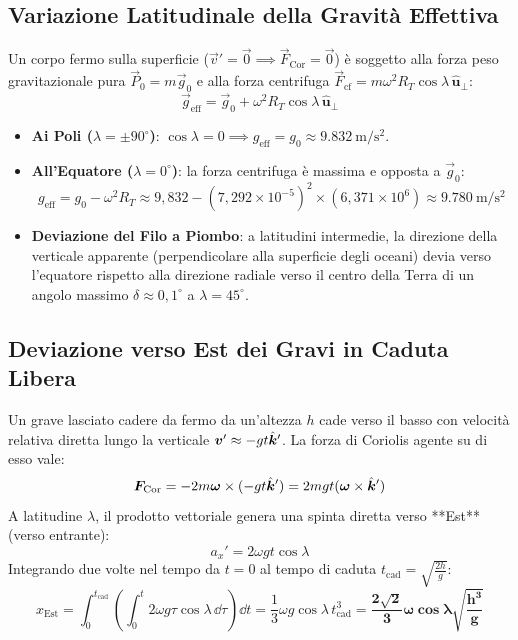 \subsection{Variazione Latitudinale della Gravità Effettiva}
Un corpo fermo sulla superficie ($\vec{v}' = \vec{0} \implies \vec{F}_{\text{Cor}} = \vec{0}$) è soggetto alla forza peso gravitazionale pura $\vec{P}_0 = m\vec{g}_0$ e alla forza centrifuga $\vec{F}_{\text{cf}} = m\omega^2 R_T \cos\lambda\,\hat{\bm{u}}_\perp$:
\begin{equation}
    \vec{g}_{\text{eff}} = \vec{g}_0 + \omega^2 R_T\cos\lambda\,\hat{\bm{u}}_\perp
\end{equation}
\begin{itemize}
    \item \textbf{Ai Poli ($\lambda = \pm 90^\circ$)}: $\cos\lambda = 0 \implies g_{\text{eff}} = g_0 \approx \SI{9.832}{\metre\per\second\squared}$.
    \item \textbf{All'Equatore ($\lambda = 0^\circ$)}: la forza centrifuga è massima e opposta a $\vec{g}_0$:
    \begin{equation}
        g_{\text{eff}} = g_0 - \omega^2 R_T \approx 9{,}832 - (7{,}292\times 10^{-5})^2 \times (6{,}371\times 10^6) \approx \SI{9.780}{\metre\per\second\squared}
    \end{equation}
    \item \textbf{Deviazione del Filo a Piombo}: a latitudini intermedie, la direzione della verticale apparente (perpendicolare alla superficie degli oceani) devia verso l'equatore rispetto alla direzione radiale verso il centro della Terra di un angolo massimo $\delta \approx 0{,}1^\circ$ a $\lambda = 45^\circ$.
\end{itemize}

\subsection{Deviazione verso Est dei Gravi in Caduta Libera}
Un grave lasciato cadere da fermo da un'altezza $h$ cade verso il basso con velocità relativa diretta lungo la verticale $\bm{v}' \approx -g t\hat{\bm{k}}'$. La forza di Coriolis agente su di esso vale:
\begin{equation}
    \bm{F}_{\text{Cor}} = -2m\bm{\omega}\times(-gt\hat{\bm{k}}') = 2mg t (\bm{\omega}\times\hat{\bm{k}}')
\end{equation}
A latitudine $\lambda$, il prodotto vettoriale genera una spinta diretta verso **Est** (verso entrante):
\begin{equation}
    a_x' = 2\omega g t \cos\lambda
\end{equation}
Integrando due volte nel tempo da $t=0$ al tempo di caduta $t_{\text{cad}} = \sqrt{\frac{2h}{g}}$:
\begin{equation}
    x_{\text{Est}} = \int_0^{t_{\text{cad}}} \left(\int_0^t 2\omega g \tau \cos\lambda\,\dd\tau\right)\dd t = \frac{1}{3}\omega g \cos\lambda\,t_{\text{cad}}^3 = \mathbf{\frac{2\sqrt{2}}{3}\omega\cos\lambda \sqrt{\frac{h^3}{g}}}
    \label{eq:deviazione_est}
\end{equation}

